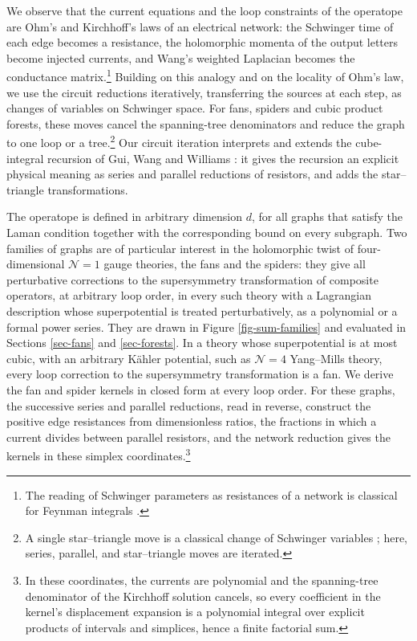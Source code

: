 \documentclass[11pt]{article}
\numberwithin{equation}{section}
\numberwithin{figure}{section}
\numberwithin{table}{section}
\begin{document}
We observe that the current equations and the loop constraints of the operatope \cite[Equations (2.26), (2.31), (2.33)]{operatope} are Ohm's and Kirchhoff's laws of an electrical network: the Schwinger time of each edge becomes a resistance, the holomorphic momenta of the output letters become injected currents, and Wang's weighted Laplacian \cite[Definition 12, Remark 6]{Wang} becomes the conductance matrix.\footnote{The reading of Schwinger parameters as resistances of a network is classical for Feynman integrals \cite{Mathews,PSS}.} Building on this analogy and on the locality of Ohm's law, we use the circuit reductions iteratively, transferring the sources at each step, as changes of variables on Schwinger space. For fans, spiders and cubic product forests, these moves cancel the spanning-tree denominators and reduce the graph to one loop or a tree.\footnote{A single star--triangle move is a classical change of Schwinger variables \cite[Lemma 2.4.23]{Panzer}; here, series, parallel, and star--triangle moves are iterated.} Our circuit iteration interprets and extends the cube-integral recursion of Gui, Wang and Williams \cite[Theorem 4.13]{GWW}: it gives the recursion an explicit physical meaning as series and parallel reductions of resistors, and adds the star--triangle transformations.

The operatope is defined in arbitrary dimension $d$, for all graphs that satisfy the Laman condition together with the corresponding bound on every subgraph. Two families of graphs are of particular interest in the holomorphic twist of four-dimensional $\mathcal N=1$ gauge theories, the fans and the spiders: they give all perturbative corrections to the supersymmetry transformation of composite operators, at arbitrary loop order, in every such theory with a Lagrangian description whose superpotential is treated perturbatively, as a polynomial or a formal power series. They are drawn in Figure \ref{fig-sum-families} and evaluated in Sections \ref{sec-fans} and \ref{sec-forests}. In a theory whose superpotential is at most cubic, with an arbitrary K\"ahler potential, such as $\mathcal N=4$ Yang--Mills theory, every loop correction to the supersymmetry transformation is a fan. We derive the fan and spider kernels in closed form at every loop order. For these graphs, the successive series and parallel reductions, read in reverse, construct the positive edge resistances from dimensionless ratios, the fractions in which a current divides between parallel resistors, and the network reduction gives the kernels in these simplex coordinates.\footnote{In these coordinates, the currents are polynomial and the spanning-tree denominator of the Kirchhoff solution cancels, so every coefficient in the kernel's displacement expansion is a polynomial integral over explicit products of intervals and simplices, hence a finite factorial sum.}
\end{document}
